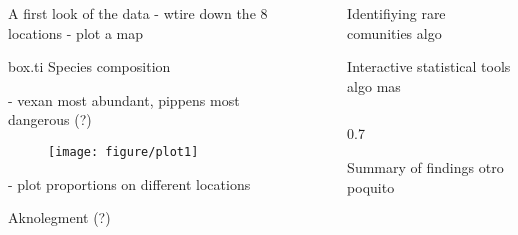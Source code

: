 \documentclass[final]{beamer}\usepackage[]{graphicx}\usepackage[]{color}
\makeatletter
\def\maxwidth{ %
  \ifdim\Gin@nat@width>\linewidth
    \linewidth
  \else
    \Gin@nat@width
  \fi
}
\newenvironment{knitrout}{}{} %
\newlength{\onecolwid}
\newlength{\twocolwid}
\newlength{\threecolwid}
\makeatother
\begin{document}
\begin{frame}
\begin{columns}[t,totalwidth=\threecolwid]
\begin{column}{\onecolwid}
\begin{alertblock}{ A first look of the data }
- wtire down the 8 locations 
- plot a map

\begin{beamercolorbox}{box.ti}
Species composition
\end{beamercolorbox}
- vexan most abundant, pippens most dangerous (?) 

 \begin{figure}
\begin{knitrout}
\color{fgcolor}
\texttt{[image: figure/plot1]} 

\end{knitrout}

 \end{figure}

- plot proportions on different locations
\end{alertblock}


\begin{alertblock}{ Aknolegment (?) }

\end{alertblock}

\end{column}  %

\begin{column}{1cm}\end{column}      %


  \begin{column}{\twocolwid}

      \begin{alertblock}{ Identifiying rare comunities }
        algo 
      \end{alertblock}

      \begin{alertblock}{ Interactive statistical tools }
          algo mas 
      \end{alertblock}

      \begin{block}
      
        \begin{columns}[t,totalwidth=0.99\twocolwid ]
            
        \begin{column}{0.7\twocolwid}
              \begin{alertblock}{Summary of findings}
                    otro poquito
                \end{alertblock}
        \end{column}


\end{columns}
\end{block}
\end{column}
\end{columns}
\end{frame}
\end{document}
